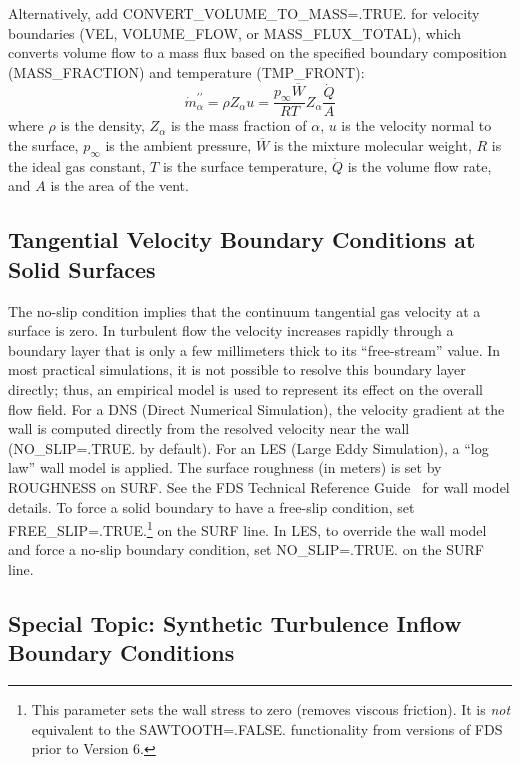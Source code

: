 \documentclass[11pt]{book}
\begin{document}
Alternatively, add {\ct CONVERT\_VOLUME\_TO\_MASS=.TRUE.} for velocity boundaries ({\ct VEL}, {\ct VOLUME\_FLOW}, or {\ct MASS\_FLUX\_TOTAL}), which converts volume flow to a mass flux based on the specified boundary composition ({\ct MASS\_FRACTION}) and temperature ({\ct TMP\_FRONT}):
\begin{equation}
\dot{m}_\alpha^{\prime\prime} = \rho Z_\alpha u = \frac{p_\infty \overline{W}}{R T} Z_\alpha \frac{\dot{Q}}{A}
\end{equation}
where $\rho$ is the density, $Z_\alpha$ is the mass fraction of $\alpha$, $u$ is the velocity normal to the surface, $p_\infty$ is the ambient pressure, $\overline{W}$ is the mixture molecular weight, $R$ is the ideal gas constant, $T$ is the surface temperature, $\dot{Q}$ is the volume flow rate, and $A$ is the area of the vent.

\subsection{Tangential Velocity Boundary Conditions at Solid Surfaces}
\label{info:WALL_MODEL}

The no-slip condition implies that the continuum tangential gas velocity at a surface is zero.
In turbulent flow the velocity increases rapidly through a boundary layer that is only a few millimeters thick to its ``free-stream'' value.
In most practical simulations, it is not possible to resolve this boundary layer directly; thus, an empirical model is used to represent its effect on the overall flow field. For a DNS (Direct Numerical Simulation), the velocity gradient at the wall is computed directly from the resolved velocity near the wall ({\ct NO\_SLIP=.TRUE.} by default). For an LES (Large Eddy Simulation), a ``log law'' wall model is applied. The surface roughness (in meters) is set by {\ct ROUGHNESS} on {\ct SURF}. See the FDS Technical Reference Guide~\cite{FDS_Math_Guide} for wall model details. To force a solid boundary to have a free-slip condition, set {\ct FREE\_SLIP=.TRUE.}\footnote{This parameter sets the wall stress to zero (removes viscous friction).  It is \emph{not} equivalent to the {\ct SAWTOOTH=.FALSE.} functionality from versions of FDS prior to Version 6.} on the {\ct SURF} line. In LES, to override the wall model and force a no-slip boundary condition, set {\ct NO\_SLIP=.TRUE.} on the {\ct SURF} line.


\subsection{Special Topic: Synthetic Turbulence Inflow Boundary Conditions}
\label{info:synthetic_turbulence}
\end{document}
